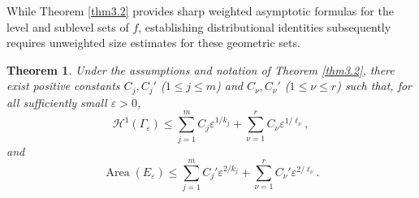 \documentclass[12pt,twoside]{amsart}
\newcommand{\D}{\ensuremath{\mathbb{D}}}
\numberwithin{equation}{section}
\newtheorem{theorem}{Theorem}[section]
\numberwithin{definition}{section} %
\begin{document}


\medskip
While Theorem \ref{thm3.2} provides sharp weighted asymptotic formulas for the level and sublevel sets of $f$, establishing distributional identities subsequently requires unweighted size estimates for these geometric sets.

\begin{theorem}\label{thm3.3}
Under the assumptions and notation of Theorem \ref{thm3.2}, there exist positive constants $C_j, C_j'$ ($1 \le j \le m$) and $C_\nu, C_\nu'$ ($1 \le \nu \le r$) such that, for all sufficiently small $\varepsilon > 0$,
\[
\mathcal{H}^1(\Gamma_\varepsilon)
\le
\sum_{j=1}^m C_j \varepsilon^{1/k_j}
+
\sum_{\nu=1}^r C_\nu \varepsilon^{1/\ell_\nu},
\]
and
\[
\operatorname{Area}(E_\varepsilon)
\le
\sum_{j=1}^m C_j' \varepsilon^{2/k_j}
+
\sum_{\nu=1}^r C_\nu' \varepsilon^{2/\ell_\nu}.
\]
\end{theorem}
\end{document}
